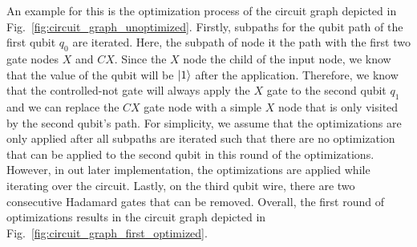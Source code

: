 An example for this is the optimization process of the circuit graph depicted in Fig.~\ref{fig:circuit_graph_unoptimized}. Firstly, subpaths for the qubit path of the first qubit $q_0$ are iterated. Here, the subpath of node it the path with the first two gate nodes $X$ and $CX$. Since the $X$ node the child of the input node, we know that the value of the qubit will be $\ket{1}$ after the application. Therefore, we know that the controlled-not gate will always apply the $X$ gate to the second qubit $q_1$ and we can replace the $CX$ gate node with a simple $X$ node that is only visited by the second qubit's path. For simplicity, we assume that the optimizations are only applied after all subpaths are iterated such that there are no optimization that can be applied to the second qubit in this round of the optimizations. However, in out later implementation, the optimizations are applied while iterating over the circuit. Lastly, on the third qubit wire, there are two consecutive Hadamard gates that can be removed. Overall, the first round of optimizations results in the circuit graph depicted in Fig.~\ref{fig:circuit_graph_first_optimized}. 
 
